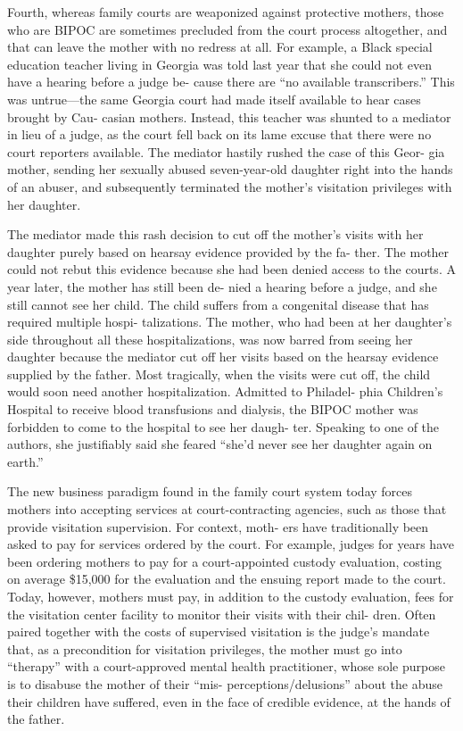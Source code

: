 Fourth, whereas family courts are weaponized against protective
mothers, those who are BIPOC are sometimes precluded from the court
process altogether, and that can leave the mother with no redress at all.
For example, a Black special education teacher living in Georgia was
told last year that she could not even have a hearing before a judge be-
cause there are “no available transcribers.” This was untrue—the same
Georgia court had made itself available to hear cases brought by Cau-
casian mothers. Instead, this teacher was shunted to a mediator in lieu of
a judge, as the court fell back on its lame excuse that there were no court
reporters available. The mediator hastily rushed the case of this Geor-
gia mother, sending her sexually abused seven-year-old daughter right
into the hands of an abuser, and subsequently terminated the mother’s
visitation privileges with her daughter. \pfl{}


The mediator made this rash decision to cut off the mother’s visits
with her daughter purely based on hearsay evidence provided by the fa-
ther. The mother could not rebut this evidence because she had been
denied access to the courts. A year later, the mother has still been de-
nied a hearing before a judge, and she still cannot see her child. The
child suffers from a congenital disease that has required multiple hospi-
talizations. The mother, who had been at her daughter’s side throughout
all these hospitalizations, was now barred from seeing her daughter
because the mediator cut off her visits based on the hearsay evidence
supplied by the father. Most tragically, when the visits were cut off, the
child would soon need another hospitalization. Admitted to Philadel-
phia Children’s Hospital to receive blood transfusions and dialysis, the
BIPOC mother was forbidden to come to the hospital to see her daugh-
ter. Speaking to one of the authors, she justifiably said she feared “she’d
never see her daughter again on earth.” \pfl{}



The new business paradigm found in the family court system today
forces mothers into accepting services at court-contracting agencies,
such as those that provide visitation supervision. For context, moth-
ers have traditionally been asked to pay for services ordered by the
court. For example, judges for years have been ordering mothers to pay
for a court-appointed custody evaluation, costing on average \$15,000
for the evaluation and the ensuing report made to the court. Today,
however, mothers must pay, in addition to the custody evaluation, fees
for the visitation center facility to monitor their visits with their chil-
dren. Often paired together with the costs of supervised visitation is
the judge’s mandate that, as a precondition for visitation privileges, the
mother must go into “therapy” with a court-approved mental health
practitioner, whose sole purpose is to disabuse the mother of their “mis-
perceptions/delusions” about the abuse their children have suffered,
even in the face of credible evidence, at the hands of the father. \pfl{}


